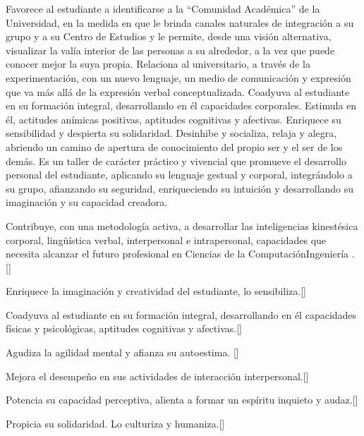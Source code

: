 \begin{syllabus}


\begin{justification}
Favorece al estudiante a identificarse a la ``Comunidad Académica'' de la Universidad, en la medida en que le brinda canales naturales de integración a su grupo y  a su Centro de Estudios y le permite,  desde una visión alternativa, visualizar la valía interior de las personas a su alrededor, a la vez que puede conocer mejor la suya propia. 
Relaciona al universitario, a través de la experimentación, con un nuevo lenguaje, un medio de comunicación y expresión que va más allá de la expresión verbal conceptualizada.
Coadyuva al estudiante en su formación integral, desarrollando en él  capacidades corporales. Estimula en él, actitudes anímicas positivas,  aptitudes cognitivas y afectivas. Enriquece su sensibilidad y despierta su solidaridad.    
Desinhibe y socializa, relaja y alegra,  abriendo un camino de apertura de conocimiento del propio ser y el ser de los demás.
Es un taller de carácter práctico y vivencial que promueve el desarrollo personal del estudiante, aplicando su lenguaje gestual y corporal, integrándolo a su grupo, afianzando su seguridad,  enriqueciendo su intuición y desarrollando su imaginación y su capacidad creadora.
\end{justification}

\begin{goals}
	\item Contribuye, con una metodología activa, a desarrollar las inteligencias kinestésica corporal, lingüística verbal, interpersonal e intrapersonal, capacidades que necesita alcanzar el futuro profesional en Ciencias de la ComputaciónIngeniería . [\Usge]
	\item Enriquece la imaginación y creatividad del estudiante, lo sensibiliza.[\Usage]
	\item Coadyuva al estudiante en su formación integral, desarrollando en él  capacidades físicas y psicológicas, aptitudes cognitivas y afectivas.[\Usage]
	\item Agudiza  la agilidad mental y afianza su autoestima. [\Usage]
	\item Mejora el desempeño en sus actividades de interacción interpersonal.[\Usage]
	\item Potencia su capacidad perceptiva, alienta a formar un espíritu inquieto y audaz.[\Usage]
	\item Propicia  su solidaridad. Lo culturiza y humaniza.[\Usage]
\end{goals}


\end{syllabus}

